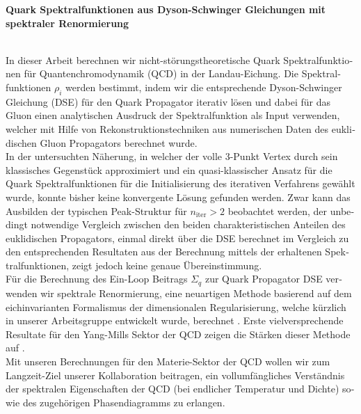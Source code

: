 \begin{center}
\textbf{\small Quark Spektralfunktionen aus Dyson-Schwinger Gleichungen mit spektraler Renormierung} \\
\vspace{.1cm}
\@author \\
\end{center}

\makeatother

\begin{otherlanguage}{ngerman}
In dieser Arbeit berechnen
 wir nicht-st\"orungstheoretische Quark Spektralfunktionen f\"ur Quantenchromodynamik (QCD) in der Landau-Eichung. Die Spektralfunktionen $\rho_i$ werden bestimmt, indem wir die entsprechende Dyson-Schwinger Gleichung (DSE) f\"ur den Quark Propagator iterativ l\"osen und dabei f\"ur das Gluon einen analytischen Ausdruck der Spektralfunktion als Input verwenden, welcher mit Hilfe von Rekonstruktionstechniken aus numerischen Daten des euklidischen Gluon Propagators berechnet wurde. \\ %
In der untersuchten N\"aherung, in welcher der volle 3-Punkt Vertex durch sein klassisches Gegenst\"uck approximiert und ein quasi-klassischer Ansatz f\"ur die Quark Spektralfunktionen f\"ur die Initialisierung des iterativen Verfahrens gew\"ahlt wurde, konnte bisher keine konvergente L\"osung gefunden werden. Zwar kann das Ausbilden der typischen Peak-Struktur f\"ur $n_{\mathrm{iter}}>2$ beobachtet werden, der unbedingt notwendige Vergleich zwischen den beiden charakteristischen Anteilen des euklidischen Propagators, einmal direkt \"uber die DSE berechnet im Vergleich zu den entsprechenden Resultaten aus der Berechnung mittels der erhaltenen Spektralfunktionen, zeigt jedoch keine genaue \"Ubereinstimmung.   \\
F\"ur die Berechnung des Ein-Loop Beitrags $\Sigma_q$ zur Quark Propagator DSE verwenden wir spektrale Renormierung, eine neuartigen Methode basierend auf dem eichinvarianten Formalismus der dimensionalen Regularisierung, welche k\"urzlich in unserer Arbeitsgruppe entwickelt wurde, berechnet \cite{Horak2019, Wink2020, HorakPawlowskiWink2020}.
Erste vielversprechende Resultate f\"ur den Yang-Mills Sektor der QCD  zeigen die St\"arken dieser Methode auf \cite{HorakPapavassiliouPawlowskiWink2021}. \\Mit unseren Berechnungen f\"ur den Materie-Sektor der QCD wollen wir zum Langzeit-Ziel unserer Kollaboration beitragen, ein vollumf\"angliches Verst\"andnis der spektralen Eigenschaften der QCD (bei endlicher Temperatur und Dichte) sowie des zugeh\"origen Phasendiagramms zu erlangen.
\end{otherlanguage}
\vfill
\cleardoublepage
